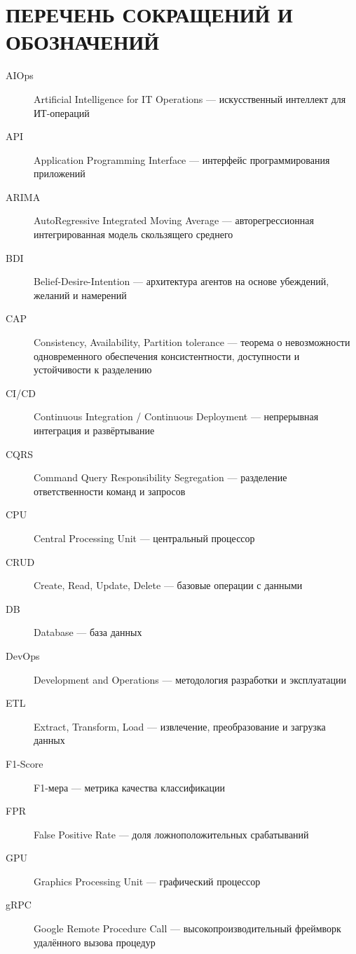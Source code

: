 \chapter*{ПЕРЕЧЕНЬ СОКРАЩЕНИЙ И ОБОЗНАЧЕНИЙ}

\vspace{1cm}

\begin{description}
    \item[AIOps] Artificial Intelligence for IT Operations — искусственный интеллект для ИТ-операций
    \item[API] Application Programming Interface — интерфейс программирования приложений
    \item[ARIMA] AutoRegressive Integrated Moving Average — авторегрессионная интегрированная модель скользящего среднего
    \item[BDI] Belief-Desire-Intention — архитектура агентов на основе убеждений, желаний и намерений
    \item[CAP] Consistency, Availability, Partition tolerance — теорема о невозможности одновременного обеспечения консистентности, доступности и устойчивости к разделению
    \item[CI/CD] Continuous Integration / Continuous Deployment — непрерывная интеграция и развёртывание
    \item[CQRS] Command Query Responsibility Segregation — разделение ответственности команд и запросов
    \item[CPU] Central Processing Unit — центральный процессор
    \item[CRUD] Create, Read, Update, Delete — базовые операции с данными
    \item[DB] Database — база данных
    \item[DevOps] Development and Operations — методология разработки и эксплуатации
    \item[ETL] Extract, Transform, Load — извлечение, преобразование и загрузка данных
    \item[F1-Score] F1-мера — метрика качества классификации
    \item[FPR] False Positive Rate — доля ложноположительных срабатываний
    \item[GPU] Graphics Processing Unit — графический процессор
    \item[gRPC] Google Remote Procedure Call — высокопроизводительный фреймворк удалённого вызова процедур

\end{description}
